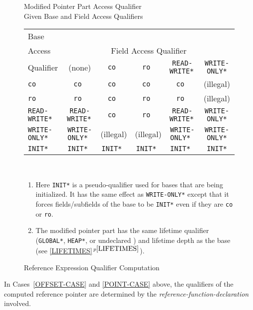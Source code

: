 \documentclass[12pt]{article}
\newcommand{\itemref}[1]{\ref{#1}$\,^{p\pageref{#1}}$}
\newlength{\figurewidth}
\newenvironment{boxedfigure}[1][!btp]%
	{\begin{figure*}[#1]
	 \begin{lrbox}{\figurebox}
	 \begin{minipage}{\figurewidth}

	 \vspace*{1ex}}%
	{
	 \vspace*{1ex}

	 \end{minipage}
	 \end{lrbox}

	 \centering
	 \fbox{\hspace*{0.1in}\usebox{\figurebox}\hspace*{0.1in}}
	 \end{figure*}}
\begin{document}
\begin{boxedfigure}[!t]
\newcommand{\tts}{\tt \small}
\begin{center}
Modified Pointer Part Access Qualifier \\
Given Base and Field Access Qualifiers
\\[1ex]
\begin{tabular}{|l|c|c|c|c|c|}
\multicolumn{1}{l}{Base}	\\
\multicolumn{1}{l}{Access}	& \multicolumn{5}{c}{Field Access Qualifier}
\\\cline{2-6}
\multicolumn{1}{l|}{Qualifier}
       & (none) & \tt co & \tt ro & \tts *READ-WRITE* & \tts *WRITE-ONLY*
\\\hline
\tt co & \tt co & \tt co & \tt co & \tt co & (illegal)
\\\hline
\tt ro & \tt ro & \tt co & \tt ro & \tt ro & (illegal)
\\\hline
\tts *READ-WRITE* & \tts *READ-WRITE* & \tt co & \tt ro & \tts *READ-WRITE*
		  & \tts *WRITE-ONLY*
\\\hline
\tts *WRITE-ONLY* & \tts *WRITE-ONLY* & (illegal) & (illegal)
                 & \tts *WRITE-ONLY* & \tts *WRITE-ONLY*
\\\hline
\tts *INIT* & \tts *INIT* & \tts *INIT* & \tts *INIT* & \tts *INIT*
            & \tts *INIT*
\\\hline
\end{tabular}
\\[1ex]
\begin{minipage}{6.0in}
\raggedright
\begin{enumerate}
\item Here\label{INIT-FORCING}
{\tt *INIT*} is a pseudo-qualifier used for bases
that are being initialized.  It has the same effect as {\tt *WRITE-ONLY*}
except that it forces fields/subfields of the base to be {\tt *INIT*}
even if they are {\tt co} or {\tt ro}.
\item The modified pointer part has the same lifetime qualifier
({\tt *GLOBAL*}, {\tt *HEAP*}, or undeclared )
and lifetime depth as the base (see \itemref{LIFETIMES}).
\end{enumerate}
\end{minipage}
\end{center}

\caption{Reference Expression Qualifier Computation}
\label{REFERENCE-EXPRESSION-QUALIFIER-COMPUTATION}
\end{boxedfigure}

In Cases~\ref{OFFSET-CASE} and \ref{POINT-CASE} above, the
qualifiers of the computed reference pointer are determined by
the {\em reference-function-declaration} involved.
\end{document}
